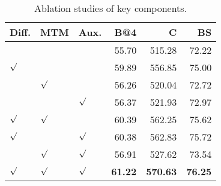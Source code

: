 \begin{table}[ht]
\centering
\small
\caption{Ablation studies of key components.}
\label{tab:key}
\begin{tabular}{lllrrr}
\toprule
Diff. & MTM & Aux. & B@4 & C & BS \\
\midrule
 &  &  & 55.70 & 515.28 & 72.22 \\
$\surd$ &  &  & 59.89 & 556.85 & 75.00 \\
 & $\surd$ &  & 56.26 & 520.04 & 72.72 \\
 &  & $\surd$ & 56.37 & 521.93 & 72.97 \\
$\surd$ & $\surd$ &  & 60.39 & 562.25 & 75.62 \\
$\surd$ &  & $\surd$ & 60.38 & 562.83 & 75.72 \\
 & $\surd$ & $\surd$ & 56.91 & 527.62 & 73.54 \\
$\surd$ & $\surd$ & $\surd$ & \textbf{61.22} & \textbf{570.63} & \textbf{76.25} \\
\bottomrule
\end{tabular}
\end{table}

